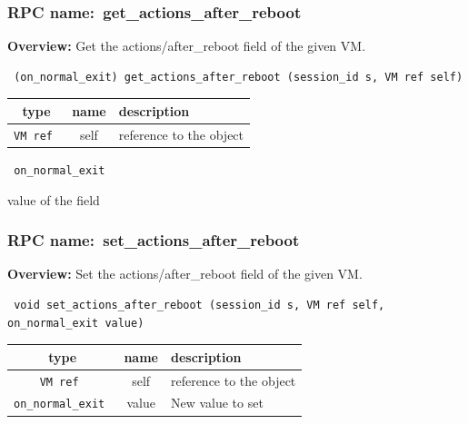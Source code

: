 \subsubsection{RPC name:~get\_actions\_after\_reboot}

{\bf Overview:} 
Get the actions/after\_reboot field of the given VM.

\begin{verbatim} (on_normal_exit) get_actions_after_reboot (session_id s, VM ref self)\end{verbatim}



 
\vspace{0.3cm}
\begin{tabular}{|c|c|p{7cm}|}
 \hline
{\bf type} & {\bf name} & {\bf description} \\ \hline
{\tt VM ref } & self & reference to the object \\ \hline 

\end{tabular}

\vspace{0.3cm}

{\tt 
on\_normal\_exit
}


value of the field
\vspace{0.3cm}
\vspace{0.3cm}
\vspace{0.3cm}
\subsubsection{RPC name:~set\_actions\_after\_reboot}

{\bf Overview:} 
Set the actions/after\_reboot field of the given VM.

\begin{verbatim} void set_actions_after_reboot (session_id s, VM ref self, on_normal_exit value)\end{verbatim}



 
\vspace{0.3cm}
\begin{tabular}{|c|c|p{7cm}|}
 \hline
{\bf type} & {\bf name} & {\bf description} \\ \hline
{\tt VM ref } & self & reference to the object \\ \hline 

{\tt on\_normal\_exit } & value & New value to set \\ \hline 

\end{tabular}

